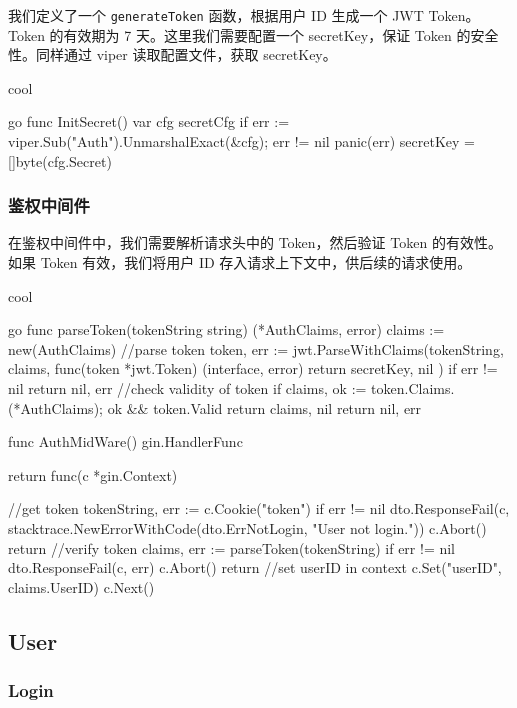 我们定义了一个 \texttt{generateToken} 函数，根据用户 ID 生成一个 JWT Token。Token 的有效期为 7 天。这里我们需要配置一个 secretKey，保证 Token 的安全性。同样通过 viper 读取配置文件，获取 secretKey。

\begin{codebox}{}{cool}
\begin{amzcode}{go}
func InitSecret() {
	var cfg secretCfg
	if err := viper.Sub("Auth").UnmarshalExact(&cfg); err != nil {
		panic(err)
	}
	secretKey = []byte(cfg.Secret)
}
\end{amzcode}
\end{codebox}

\subsubsection{鉴权中间件}

在鉴权中间件中，我们需要解析请求头中的 Token，然后验证 Token 的有效性。如果 Token 有效，我们将用户 ID 存入请求上下文中，供后续的请求使用。

\begin{codebox}{}{cool}
\begin{amzcode}{go}
func parseToken(tokenString string) (*AuthClaims, error) {
	claims := new(AuthClaims)
	//parse token
	token, err := jwt.ParseWithClaims(tokenString, claims, func(token *jwt.Token) (interface{}, error) {
		return secretKey, nil
	})
	if err != nil {
		return nil, err
	}
	//check validity of token
	if claims, ok := token.Claims.(*AuthClaims); ok && token.Valid {
		return claims, nil
	}
	return nil, err
}

func AuthMidWare() gin.HandlerFunc {
	return func(c *gin.Context) {
		//get token
		tokenString, err := c.Cookie("token")
		if err != nil {
			dto.ResponseFail(c, stacktrace.NewErrorWithCode(dto.ErrNotLogin, "User not login."))
			c.Abort()
			return
		}
		//verify token
		claims, err := parseToken(tokenString)
		if err != nil {
			dto.ResponseFail(c, err)
			c.Abort()
			return
		}
		//set userID in context
		c.Set("userID", claims.UserID)
		c.Next()

	}
}
\end{amzcode}
\end{codebox}

\subsection{User}

\subsubsection{Login}

